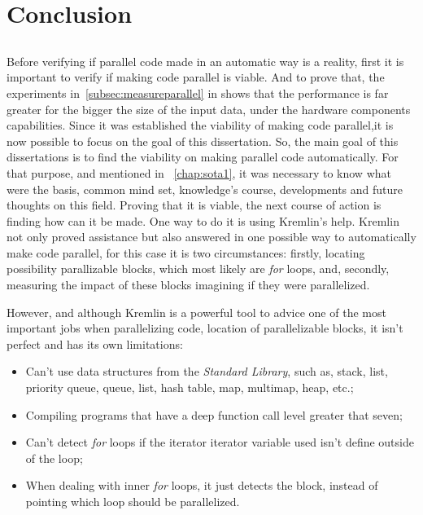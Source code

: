 \chapter{Conclusion}\label{chap:chap6}

\section*{}

Before verifying if parallel code made in an automatic way is a reality, first it is important to verify if making code parallel is viable. And to prove that, the experiments in~\ref{subsec:measureparallel} in shows that the performance is far greater for the bigger the size of the input data, under the hardware components capabilities.
Since it was established the viability of making code parallel,it is now possible to focus on the goal of this dissertation. So, the main goal of this dissertations is to find the viability on making parallel code automatically. For that purpose, and mentioned in ~\ref{chap:sota1}, it was necessary to know what were the basis, common mind set, knowledge's course, developments and future thoughts on this field. Proving that it is viable, the next course of action is finding how can it be made. One way to do it is using Kremlin's help. Kremlin not only proved assistance but also answered in one possible way to automatically make code parallel, for this case it is two circumstances: firstly, locating possibility parallizable blocks, which most likely are \textit{for} loops, and, secondly, measuring the impact of these blocks imagining if they were parallelized. 

However, and although Kremlin is a powerful tool to advice one of the most important jobs when parallelizing code, location of parallelizable blocks, it isn't perfect and has its own limitations:

\begin{itemize}
	\item Can't use data structures from the \textit{Standard Library}, such as, stack, list, priority queue, queue, list, hash table, map, multimap, heap, etc.;
	\item Compiling programs that have a deep function call level greater that seven;
	\item Can't detect \textit{for} loops if the iterator iterator variable used isn't define outside of the loop;
	\item When dealing with inner \textit{for} loops, it just detects the block, instead of pointing which loop should be parallelized.
\end{itemize}

